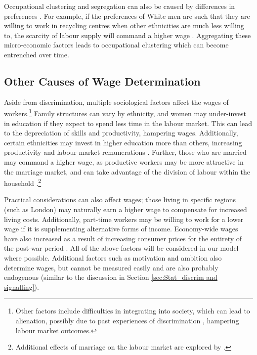 \documentclass[class=article, crop=false]{standalone}
\begin{document}
Occupational clustering and segregation can also be caused by differences in preferences \citep{Thaler}. For example, if the preferences of White men are such that they are willing to work in recycling centres when other ethnicities are much less willing to, the scarcity of labour supply will command a higher wage \citep{Altonji}. Aggregating these micro-economic factors leads to occupational clustering which can become entrenched over time.


\subsection{Other Causes of Wage Determination}
\label{sec:other_causes_of_discrimination}
Aside from discrimination, multiple sociological factors affect the wages of workers.\footnote{Other factors include difficulties in integrating into society, which can lead to alienation, possibly due to past experiences of discrimination \citep{Berthoud}, hampering labour market outcomes.} Family structures can vary by ethnicity, and women may under-invest in education if they expect to spend less time in the labour market. This can lead to the depreciation of skills and productivity, hampering wages. Additionally, certain ethnicities may invest in higher education more than others, increasing productivity and labour market remunerations \citep{Becker}. Further, those who are married may command a higher wage, as productive workers may be more attractive in the marriage market, and can take advantage of the division of labour within the household \citep{Nakosteen, Bardasi}.\footnote{Additional effects of marriage on the labour market are explored by \citet{Ahituv}.}

Practical considerations can also affect wages; those living in specific regions (such as London) may naturally earn a higher wage to compensate for increased living costs. Additionally, part-time workers may be willing to work for a lower wage if it is supplementing alternative forms of income. Economy-wide wages have also increased as a result of increasing consumer prices for the entirety of the post-war period \citep{WorldBank}. All of the above factors will be considered in our model where possible. Additional factors such as motivation and ambition also determine wages, but cannot be measured easily and are also probably endogenous (similar to the discussion in Section \ref{sec:Stat_discrim and signalling}).

\ifstandalone

\fi
\end{document}
